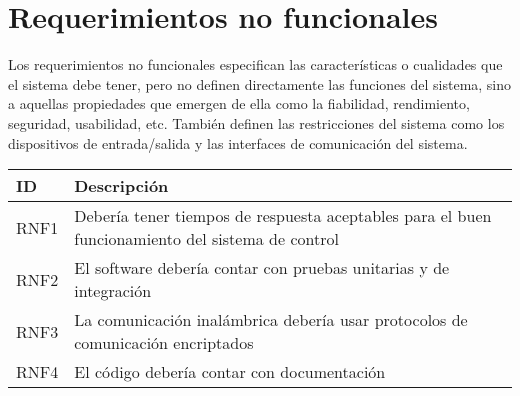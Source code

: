 \section{Requerimientos no funcionales}

Los requerimientos no funcionales especifican las características o cualidades que el sistema debe tener, pero no definen directamente las funciones del sistema, sino a aquellas propiedades que emergen de ella como la fiabilidad, rendimiento, seguridad, usabilidad, etc. También definen las restricciones del sistema como los dispositivos de entrada/salida y las interfaces de comunicación del sistema.

\begin{center}
    \begin{tabular} {
        | >{\centering\arraybackslash}m{1cm}
        | >{\centering\arraybackslash}m{13cm}|}
        \hline \rowcolor{test_header_color}
            ID & Descripción \\
        \hline
            RNF1 & Debería tener tiempos de respuesta aceptables para el buen funcionamiento del sistema de control \\
        \hline
            RNF2 & El software debería contar con pruebas unitarias y de integración \\
        \hline
            RNF3 & La comunicación inalámbrica debería usar protocolos de comunicación encriptados \\
        \hline
            RNF4 & El código debería contar con documentación \\
        \hline
    \end{tabular}
\end{center}